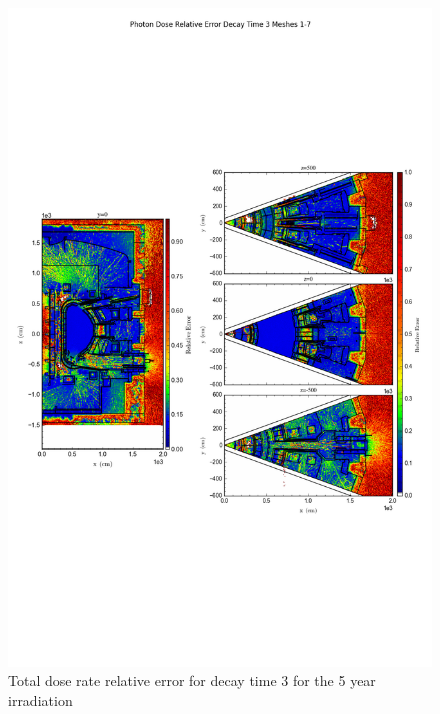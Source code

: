 \documentclass[12pt]{article}
\begin{document}
\begin{figure}[ht!]
\centering
\includegraphics[trim={0cm 8cm, 0cm 8cm},clip,scale=0.75]{../plots/final_model/5year/Photon_Dose_Relative_Error_Decay_Time_3_Meshes_1-7.png}
\caption{Total dose rate relative error for decay time 3 for the 5 year irradiation}
\label{fig:photons_5y_dc3_nob4c_relerr}
\end{figure}
\clearpage
\newpage
\end{document}

